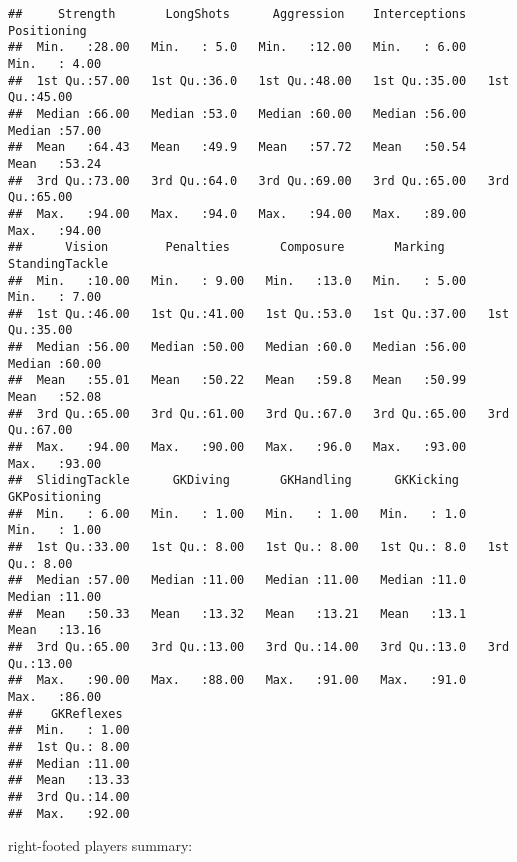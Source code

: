 \documentclass[
]{article}
\begin{document}
\begin{verbatim}
##     Strength       LongShots      Aggression    Interceptions    Positioning   
##  Min.   :28.00   Min.   : 5.0   Min.   :12.00   Min.   : 6.00   Min.   : 4.00  
##  1st Qu.:57.00   1st Qu.:36.0   1st Qu.:48.00   1st Qu.:35.00   1st Qu.:45.00  
##  Median :66.00   Median :53.0   Median :60.00   Median :56.00   Median :57.00  
##  Mean   :64.43   Mean   :49.9   Mean   :57.72   Mean   :50.54   Mean   :53.24  
##  3rd Qu.:73.00   3rd Qu.:64.0   3rd Qu.:69.00   3rd Qu.:65.00   3rd Qu.:65.00  
##  Max.   :94.00   Max.   :94.0   Max.   :94.00   Max.   :89.00   Max.   :94.00  
##      Vision        Penalties       Composure       Marking      StandingTackle 
##  Min.   :10.00   Min.   : 9.00   Min.   :13.0   Min.   : 5.00   Min.   : 7.00  
##  1st Qu.:46.00   1st Qu.:41.00   1st Qu.:53.0   1st Qu.:37.00   1st Qu.:35.00  
##  Median :56.00   Median :50.00   Median :60.0   Median :56.00   Median :60.00  
##  Mean   :55.01   Mean   :50.22   Mean   :59.8   Mean   :50.99   Mean   :52.08  
##  3rd Qu.:65.00   3rd Qu.:61.00   3rd Qu.:67.0   3rd Qu.:65.00   3rd Qu.:67.00  
##  Max.   :94.00   Max.   :90.00   Max.   :96.0   Max.   :93.00   Max.   :93.00  
##  SlidingTackle      GKDiving       GKHandling      GKKicking    GKPositioning  
##  Min.   : 6.00   Min.   : 1.00   Min.   : 1.00   Min.   : 1.0   Min.   : 1.00  
##  1st Qu.:33.00   1st Qu.: 8.00   1st Qu.: 8.00   1st Qu.: 8.0   1st Qu.: 8.00  
##  Median :57.00   Median :11.00   Median :11.00   Median :11.0   Median :11.00  
##  Mean   :50.33   Mean   :13.32   Mean   :13.21   Mean   :13.1   Mean   :13.16  
##  3rd Qu.:65.00   3rd Qu.:13.00   3rd Qu.:14.00   3rd Qu.:13.0   3rd Qu.:13.00  
##  Max.   :90.00   Max.   :88.00   Max.   :91.00   Max.   :91.0   Max.   :86.00  
##    GKReflexes   
##  Min.   : 1.00  
##  1st Qu.: 8.00  
##  Median :11.00  
##  Mean   :13.33  
##  3rd Qu.:14.00  
##  Max.   :92.00
\end{verbatim}

right-footed players summary:
\end{document}
